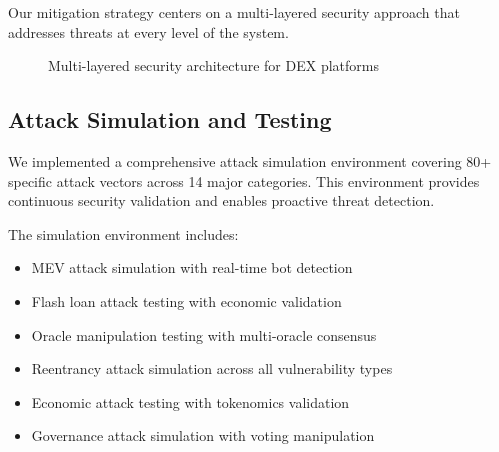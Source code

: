 \documentclass[11pt,a4paper]{article}
\begin{document}
Our mitigation strategy centers on a multi-layered security approach that addresses threats at every level of the system.

\begin{figure}[h]
\centering
{}
\caption{Multi-layered security architecture for DEX platforms}
\end{figure}

\subsection{Attack Simulation and Testing}

We implemented a comprehensive attack simulation environment covering 80+ specific attack vectors across 14 major categories. This environment provides continuous security validation and enables proactive threat detection.

The simulation environment includes:
\begin{itemize}
\item MEV attack simulation with real-time bot detection
\item Flash loan attack testing with economic validation
\item Oracle manipulation testing with multi-oracle consensus
\item Reentrancy attack simulation across all vulnerability types
\item Economic attack testing with tokenomics validation
\item Governance attack simulation with voting manipulation
\end{itemize}
\end{document}
